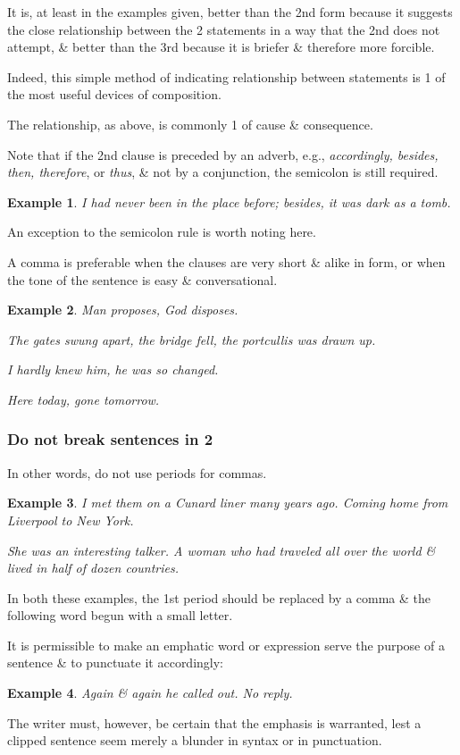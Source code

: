 \documentclass{article}
\newtheorem{example}{Example}
\begin{document}
It is, at least in the examples given, better than the 2nd form because it suggests the close relationship between the 2 statements in a way that the 2nd does not attempt, \& better than the 3rd because it is briefer \& therefore more forcible.

Indeed, this simple method of indicating relationship between statements is 1 of the most useful devices of composition.

The relationship, as above, is commonly 1 of cause \& consequence.

%
Note that if the 2nd clause is preceded by an adverb, e.g., {\it accordingly, besides, then, therefore}, or {\it thus}, \& not by a conjunction, the semicolon is still required.
\begin{example}
	I had never been in the place before; besides, it was dark as a tomb.
\end{example}
An exception to the semicolon rule is worth noting here.

A comma is preferable when the clauses are very short \& alike in form, or when the tone of the sentence is easy \& conversational.
\begin{example}
	Man proposes, God disposes.
	
	The gates swung apart, the bridge fell, the portcullis was drawn up.
	
	I hardly knew him, he was so changed.
	
	Here today, gone tomorrow.
\end{example}


\subsubsection{Do not break sentences in 2}
In other words, do not use periods for commas.
\begin{example}
	I met them on a Cunard liner many years ago. Coming home from Liverpool to New York.
	
	She was an interesting talker. A woman who had traveled all over the world \& lived in half of dozen countries.
\end{example}
In both these examples, the 1st period should be replaced by a comma \& the following word begun with a small letter.

%
It is permissible to make an emphatic word or expression serve the purpose of a sentence \& to punctuate it accordingly:
\begin{example}
	Again \& again he called out. No reply.
\end{example}
The writer must, however, be certain that the emphasis is warranted, lest a clipped sentence seem merely a blunder in syntax or in punctuation.
\end{document}
